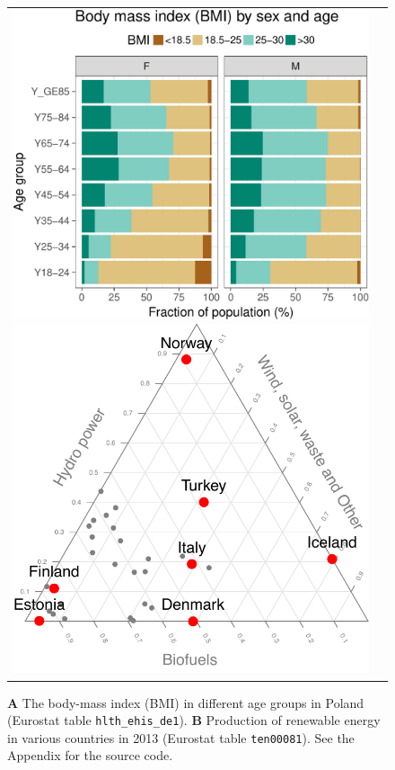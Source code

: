 \begin{figure}
\begin{center}
\begin{tabular}{cc}
\includegraphics{2015-manu-bmi-1}
\includegraphics{2015-manu-energy-1}
\end{tabular}
\end{center}
\caption{{\bf A} The body-mass index (BMI) in different age groups in Poland (Eurostat table \texttt{hlth\_ehis\_de1}). {\bf B} Production of renewable energy in various countries in 2013 (Eurostat table \texttt{ten00081}). See the Appendix for the source code.}
\label{fig:bmi}
\end{figure}



